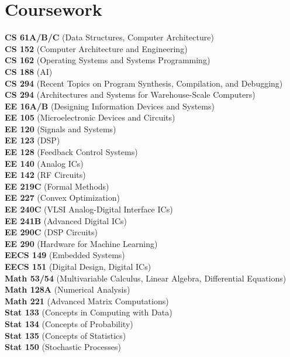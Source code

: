 \documentclass[10pt]{article}
\begin{document}
\section{Coursework}
\textbf{CS 61A/B/C} (Data Structures, Computer Architecture)\\
\textbf{CS 152} (Computer Architecture and Engineering)\\
\textbf{CS 162} (Operating Systems and Systems Programming)\\
\textbf{CS 188} (AI)\\
\textbf{CS 294} (Recent Topics on Program Synthesis, Compilation, and Debugging)\\
\textbf{CS 294} (Architectures and Systems for Warehouse-Scale Computers)\\
\textbf{EE 16A/B} (Designing Information Devices and Systems)\\
\textbf{EE 105} (Microelectronic Devices and Circuits)\\
\textbf{EE 120} (Signals and Systems)\\
\textbf{EE 123} (DSP)\\
\textbf{EE 128} (Feedback Control Systems)\\
\textbf{EE 140} (Analog ICs)\\
\textbf{EE 142} (RF Circuits)\\
\textbf{EE 219C} (Formal Methods)\\
\textbf{EE 227} (Convex Optimization)\\
\textbf{EE 240C} (VLSI Analog-Digital Interface ICs)\\
\textbf{EE 241B} (Advanced Digital ICs)\\
\textbf{EE 290C} (DSP Circuits)\\
\textbf{EE 290} (Hardware for Machine Learning)\\
\textbf{EECS 149} (Embedded Systems)\\
\textbf{EECS 151} (Digital Design, Digital ICs)\\
\textbf{Math 53/54} (Multivariable Calculus, Linear Algebra, Differential Equations)\\
\textbf{Math 128A} (Numerical Analysis)\\
\textbf{Math 221} (Advanced Matrix Computations)\\
\textbf{Stat 133} (Concepts in Computing with Data)\\
\textbf{Stat 134} (Concepts of Probability)\\
\textbf{Stat 135} (Concepts of Statistics)\\
\textbf{Stat 150} (Stochastic Processes)
\end{document}
